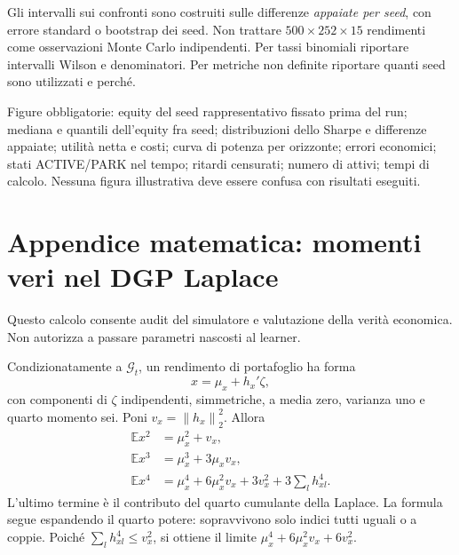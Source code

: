 \documentclass[11pt,a4paper]{article}
\theoremstyle{definition}\newtheorem{definition}[theorem]{Definizione}
\theoremstyle{remark}\newtheorem{remark}[theorem]{Osservazione}
\newcommand{\E}{\mathbb E}\newcommand{\PP}{\mathbb P}\newcommand{\R}{\mathbb R}
\newcommand{\norm}[1]{\left\lVert#1\right\rVert}\newcommand{\abs}[1]{\left|#1\right|}
\begin{document}
Gli intervalli sui confronti sono costruiti sulle differenze \emph{appaiate per seed}, con errore standard o bootstrap dei seed. Non trattare $500\times252\times15$ rendimenti come osservazioni Monte Carlo indipendenti. Per tassi binomiali riportare intervalli Wilson e denominatori. Per metriche non definite riportare quanti seed sono utilizzati e perché.

Figure obbligatorie: equity del seed rappresentativo fissato prima del run; mediana e quantili dell'equity fra seed; distribuzioni dello Sharpe e differenze appaiate; utilità netta e costi; curva di potenza per orizzonte; errori economici; stati ACTIVE/PARK nel tempo; ritardi censurati; numero di attivi; tempi di calcolo. Nessuna figura illustrativa deve essere confusa con risultati eseguiti.

\section{Appendice matematica: momenti veri nel DGP Laplace}
\label{sec:laplace}
Questo calcolo consente audit del simulatore e valutazione della verità economica. Non autorizza a passare parametri nascosti al learner.

Condizionatamente a $\mathcal G_t$, un rendimento di portafoglio ha forma
\begin{equation}
 x=\mu_x+h_x'\zeta,
\end{equation}
con componenti di $\zeta$ indipendenti, simmetriche, a media zero, varianza uno e quarto momento sei. Poni $v_x=\norm{h_x}_2^2$. Allora
\begin{align}
 \E x^2&=\mu_x^2+v_x,\\
 \E x^3&=\mu_x^3+3\mu_xv_x,\\
 \E x^4&=\mu_x^4+6\mu_x^2v_x+3v_x^2+3\sum_l h_{xl}^4.
\end{align}
L'ultimo termine è il contributo del quarto cumulante della Laplace. La formula segue espandendo il quarto potere: sopravvivono solo indici tutti uguali o a coppie. Poiché $\sum_l h_{xl}^4\le v_x^2$, si ottiene il limite $\mu_x^4+6\mu_x^2v_x+6v_x^2$.
\end{document}
